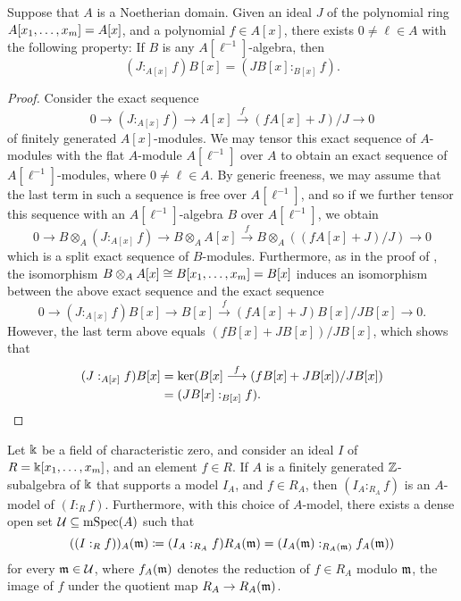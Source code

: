 \documentclass{amsart}
\begin{document}
\begin{lemma}
   \label{colon mod p: L}
   Suppose that $A$ is a Noetherian domain.
   Given an ideal $J$ of the polynomial ring $A[x_1, \ldots, x_m] = A[x]$, and a polynomial $f \in A[x]$, there exists $0 \neq \ell \in A$ with the following property\textup:
   If $B$ is any $A[\ell^{-1}]$-algebra, then
   \[
      (J:_{A[x]} f)B[x] = (JB[x] :_{B[x]} f).
   \]
 \end{lemma}

 \begin{proof}
    Consider the exact sequence
    \[
       0 \to (J :_{A[x]} f) \to A[x] \stackrel{f}{\longrightarrow} (f A[x] + J)/J \to 0
    \]
    of finitely generated $A[x]$-modules.
    We may tensor this exact sequence of $A$-modules with the flat $A$-module $A[\ell^{-1}]$ over $A$ to obtain an exact sequence of $A[\ell^{-1}]$-modules, where $0 \neq \ell \in A$.
    By generic freeness, we may assume that the last term in such a sequence is free over $A[\ell^{-1}]$, and so if we further tensor this sequence with an $A[\ell^{-1}]$-algebra $B$ over $A[\ell^{-1}]$, we obtain
    \[
       0 \to B \otimes_A (J :_{A[x]} f) \to B \otimes_A A[x] \stackrel{f}{\longrightarrow} B \otimes_A ((f A[x] + J)/J) \to 0
    \]
    which is  a split exact sequence of $B$-modules.
    Furthermore, as in the proof of , the isomorphism $B \otimes_A A[x] \cong B[x_1, \ldots, x_m]=B[x]$ induces an isomorphism between the above exact sequence and the exact sequence
    \[
       0 \to (J :_{A[x]} f) B[x] \to  B[x] \stackrel{f}{\longrightarrow} (f A[x] + J)B[x]/JB[x] \to 0.
    \]
    However, the last term above equals $(fB[x] + JB[x])/JB[x]$, which shows that
    \begin{align*}
      (J:_{A[x]} f)B[x] &= \ker ( B[x] \stackrel{f}{\longrightarrow} (fB[x] + JB[x])/JB[x])\\
      & = (JB[x] :_{B[x]} f). \qedhere
    \end{align*}
\end{proof}

\begin{corollary}
\label{colon mod p: C}  Let $\Bbbk$ be a field of characteristic zero, and consider an ideal $I$ of $R=\Bbbk[x_1, \ldots, x_m]$, and an element $f \in R$.  If $A$ is a finitely generated $\mathbb{Z}$-subalgebra of $\Bbbk$ that supports a model $I_A$, and $f \in R_A$, then  $(I_A :_{R_A} f)$ is an $A$-model of $(I:_R f)$.   Furthermore, with this choice of $A$-model, there exists a dense open set $\mathcal{U} \subseteq \operatorname{mSpec}(A)$ such that
\[ ((I :_R f))_A(\mathfrak{m}) \coloneqq (I_A :_{R_A} f) R_A(\mathfrak{m}) = (I_A(\mathfrak{m}) :_{R_A(\mathfrak{m})} f_A(\mathfrak{m})) \]
for every $\mathfrak{m} \in \mathcal{U}$, where $f_A(\mathfrak{m})$ denotes the reduction of $f \in R_A$ modulo $\mathfrak{m}$, \ie the image of $f$ under the quotient map $R_A \to R_A(\mathfrak{m})$.
 \end{corollary}
\end{document}
